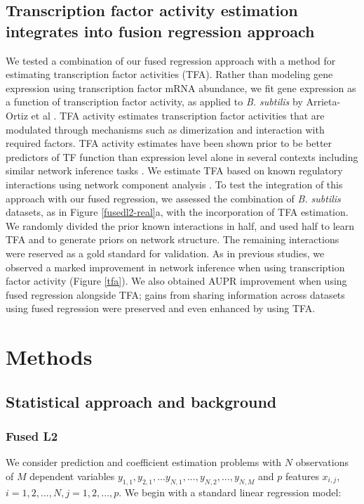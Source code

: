 \documentclass[11pt]{article}
\begin{document}
\subsection{Transcription factor activity estimation integrates into fusion regression approach}
We tested a combination of our fused regression approach with a method for estimating transcription factor activities (TFA). 
Rather than modeling gene expression using transcription factor mRNA abundance, we fit gene expression as a function of transcription factor activity, as applied to \textit{B. subtilis} by Arrieta-Ortiz et al \cite{arrieta-ortiz_experimentally_2015}. 
TFA activity estimates  transcription factor activities that are modulated through mechanisms such as dimerization and interaction with required factors.
TFA activity estimates have been shown prior to be better predictors of TF function than expression level alone in several contexts including similar network inference tasks\cite{fu_reconstructing_2011} \cite{arrieta-ortiz_experimentally_2015}. 
We estimate TFA based on known regulatory interactions using network component analysis \cite{liao2003network}.
To test the integration of this approach with our fused regression, we assessed the combination of \textit{B. subtilis} datasets, as in Figure \ref{fusedl2-real}a, with the incorporation of TFA estimation. 
We randomly divided the prior known interactions in half, and used half to learn TFA and to generate priors on network structure. 
The remaining interactions were reserved as a gold standard for validation. 
As in previous studies, we observed a marked improvement in network inference when using transcription factor activity (Figure \ref{tfa}). We also obtained AUPR improvement when using fused regression alongside TFA; gains from sharing information across datasets using fused regression were preserved and even enhanced by using TFA. 

\section{Methods}

\subsection{Statistical approach and background}
\subsubsection{Fused L2}
We consider prediction and coefficient estimation problems with $N$ observations of $M$ dependent variables $y_{1,1}, y_{2,1}, ...y_{N,1},..., y_{N,2},..., y_{N, M}$ and $p$ features $x_{i,j}$, $i=1,2,...,N, j=1,2,...,p$. We begin with a standard linear regression model:
\end{document}
